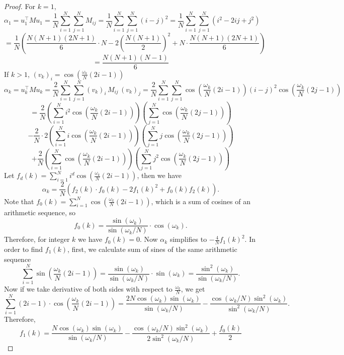 \documentclass[12pt]{article}
\theoremstyle{definition}
\begin{document}
\begin{proof}
    For $k = 1$, 
    \[
    \alpha_1 = u_1^\top M u_1 = \frac{1}{N} \sum_{i=1}^N\sum_{j=1}^N M_{ij} = \frac{1}{N} \sum_{i=1}^N\sum_{j=1}^N (i-j)^2 = \frac{1}{N} \sum_{i=1}^N\sum_{j=1}^N (i^2-2ij+j^2)
    \]
    \[ 
    =\frac{1}{N} \left(\frac{N(N+1)(2N+1)}{6}\cdot N - 2\left(\frac{N(N+1)}{2}\right)^2+N\cdot \frac{N(N+1)(2N+1)}{6}\right)
    \]
    \[ 
    =\frac{N(N+1)(N-1)}{6}
    \]
    If $k>1$, $\left(v_k\right)_i = \cos\left(\frac{\omega_k}{N}(2i-1)\right)$
    \[
    \alpha_k = u_k^\top M u_k = \frac{2}{N} \sum_{i=1}^N\sum_{j=1}^N \left(v_{k}\right)_i\,M_{ij}\, \left(v_{k}\right)_j = \frac{2}{N} \sum_{i=1}^N\sum_{j=1}^N \cos\left( \frac{\omega_k}{N} (2i-1) \right)(i-j)^2\cos\left( \frac{\omega_k}{N} (2j-1) \right)
    \]
    \[= \frac{2}{N} \left(\sum_{i=1}^N i^2 \cos\left( \frac{\omega_k}{N} (2i-1) \right)\right)\left(\sum_{j=1}^N\cos\left( \frac{\omega_k}{N} (2j-1) \right)\right)
    \]
    \[- \frac{2}{N} \cdot 2\left(\sum_{i=1}^N i \cos\left( \frac{\omega_k}{N} (2i-1) \right)\right)\left(\sum_{j=1}^N j\cos\left( \frac{\omega_k}{N} (2j-1) \right)\right)
    \]
    \[+ \frac{2}{N} \left(\sum_{i=1}^N \cos\left( \frac{\omega_k}{N} (2i-1) \right)\right)\left(\sum_{j=1}^N j^2 \cos\left( \frac{\omega_k}{N} (2j-1) \right)\right)
    \]
    Let $f_d(k) = \sum_{i=1}^N i^d \cos\left(\frac{\omega_k}{N}(2i-1)\right)$, then we have \[
    \alpha_k = \frac{2}{N}\left(f_2(k)\cdot f_0(k)-2f_1(k)^2 + f_0(k)f_2(k)\right).
    \]
    Note that $f_0(k) = \sum_{i=1}^N \cos\left(\frac{\omega_k}{N}(2i-1)\right)$, which is a sum of cosines of an arithmetic sequence, so
    \[
    f_0(k) = \frac{\sin\left(\omega_k\right)}{\sin\left(\omega_k/N\right)}\cdot\cos\left(\omega_k\right).
    \]
    Therefore, for integer $k$ we have $f_0(k) = 0$.
    Now $\alpha_k$ simplifies to $-\frac{4}{N}f_1(k)^2$. In order to find $f_1(k)$, first, we calculate sum of sines of the same arithmetic sequence
    \[
    \sum_{i=1}^N \sin\left(\frac{\omega_k}{N}(2i-1)\right) = \frac{\sin\left(\omega_k\right)}{\sin\left(\omega_k/N\right)}\cdot\sin\left(\omega_k\right) = \frac{\sin^2\left(\omega_k\right)}{\sin\left(\omega_k/N\right)}.
    \]
    Now if we take derivative of both sides with respect to $\frac{\omega_k}{N}$, we get
    \[
    \sum_{i=1}^N \left(2i-1\right)\cdot\cos\left(\frac{\omega_k}{N}(2i-1)\right)  = \frac{2N \cos\left(\omega_k\right) \sin\left(\omega_k\right)}{\sin\left(\omega_k/N\right)} - \frac{\cos\left(\omega_k/N\right) \sin^{2}\left(\omega_k\right)}{\sin^{2}\left(\omega_k/N\right)}.
    \]
    Therefore,
    \[
    f_1(k) = \frac{N \cos\left(\omega_k\right) \sin\left(\omega_k\right)}{\sin\left(\omega_k/N\right)} - \frac{\cos\left(\omega_k/N\right) \sin^{2}\left(\omega_k\right)}{2\sin^{2}\left(\omega_k/N\right)}+ \frac{f_0(k)}{2}
\]
\end{proof}
\end{document}

